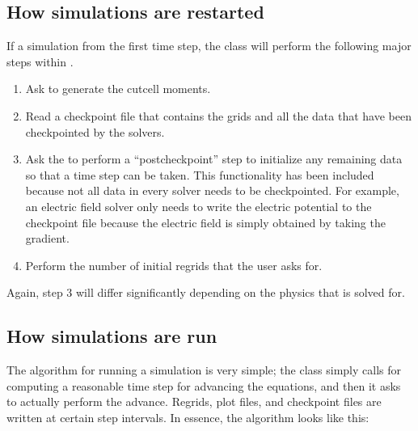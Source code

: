 \documentclass[letterpaper,10pt,english]{sphinxmanual}
\begin{document}
\subsection{How simulations are restarted}
\label{\detokenize{Driver:how-simulations-are-restarted}}
If a simulation  from the first time step, the  class will perform the following major steps within .
\begin{enumerate}
%
\item {} 
Ask  to generate the cut\sphinxhyphen{}cell moments.

\item {} 
Read a checkpoint file that contains the grids and all the data that have been checkpointed by the solvers.

\item {} 
Ask the  to perform a “post\sphinxhyphen{}checkpoint” step to initialize any remaining data so that a time step can be taken.
This functionality has been included because not all data in every solver needs to be checkpointed.
For example, an electric field solver only needs to write the electric potential to the checkpoint file because the electric field is simply obtained by taking the gradient.

\item {} 
Perform the number of initial regrids that the user asks for.

\end{enumerate}

Again, step 3 will differ significantly depending on the physics that is solved for.


\subsection{How simulations are run}
\label{\detokenize{Driver:how-simulations-are-run}}
The algorithm for running a simulation is very simple; the  class simply calls  for computing a reasonable time step for advancing the equations, and then it asks  to actually perform the advance.
Regrids, plot files, and checkpoint files are written at certain step intervals.
In essence, the algorithm looks like this:
\end{document}
